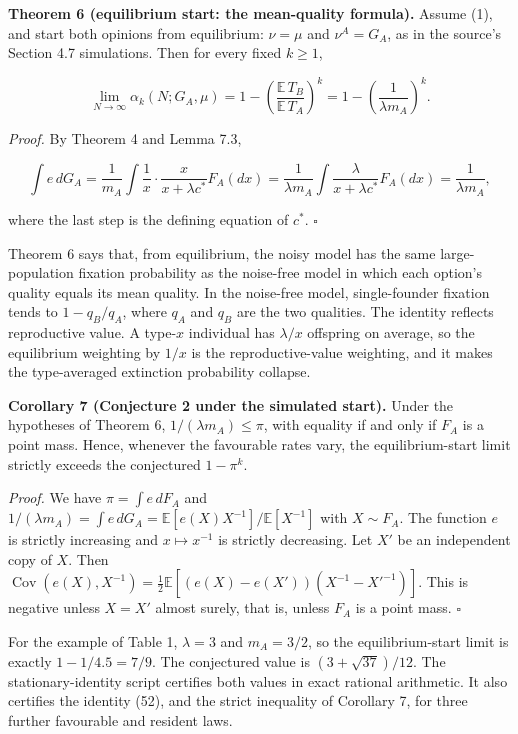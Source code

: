 \documentclass[
  british,
  11pt,
  a4paper,
]{article}
\begin{document}
\textbf{Theorem 6 (equilibrium start: the mean-quality formula).} Assume
(1), and start both opinions from equilibrium: \(\nu=\mu\) and
\(\nu^A=G_A\), as in the source's Section 4.7 simulations. Then for
every fixed \(k\ge1\),

\[
\lim_{N\to\infty}\alpha_k(N;G_A,\mu)=1-\left(\frac{\mathbb E\,T_B}{\mathbb E\,T_A}\right)^k
=1-\left(\frac1{\lambda m_A}\right)^k.
\tag{52}
\]

\emph{Proof.} By Theorem 4 and Lemma 7.3,

\[
\int e\,dG_A=\frac1{m_A}\int\frac1x\cdot\frac x{x+\lambda c^\ast}F_A(dx)
=\frac1{\lambda m_A}\int\frac\lambda{x+\lambda c^\ast}F_A(dx)=\frac1{\lambda m_A},
\]

where the last step is the defining equation of \(c^\ast\). \(\square\)

Theorem 6 says that, from equilibrium, the noisy model has the same
large-population fixation probability as the noise-free model in which
each option's quality equals its mean quality. In the noise-free model,
single-founder fixation tends to \(1-q_B/q_A\), where \(q_A\) and
\(q_B\) are the two qualities. The identity reflects reproductive value.
A type-\(x\) individual has \(\lambda/x\) offspring on average, so the
equilibrium weighting by \(1/x\) is the reproductive-value weighting,
and it makes the type-averaged extinction probability collapse.

\textbf{Corollary 7 (Conjecture 2 under the simulated start).} Under the
hypotheses of Theorem 6, \(1/(\lambda m_A)\le\pi\), with equality if and
only if \(F_A\) is a point mass. Hence, whenever the favourable rates
vary, the equilibrium-start limit strictly exceeds the conjectured
\(1-\pi^k\).

\emph{Proof.} We have \(\pi=\int e\,dF_A\) and
\(1/(\lambda m_A)=\int e\,dG_A=\mathbb E[e(X)X^{-1}]/\mathbb E[X^{-1}]\)
with \(X\sim F_A\). The function \(e\) is strictly increasing and
\(x\mapsto x^{-1}\) is strictly decreasing. Let \(X'\) be an independent
copy of \(X\). Then
\(\operatorname{Cov}(e(X),X^{-1})=\frac12\mathbb E[(e(X)-e(X'))(X^{-1}-X'^{-1})]\).
This is negative unless \(X=X'\) almost surely, that is, unless \(F_A\)
is a point mass. \(\square\)

For the example of Table 1, \(\lambda=3\) and \(m_A=3/2\), so the
equilibrium-start limit is exactly \(1-1/4.5=7/9\). The conjectured
value is \((3+\sqrt{37})/12\). The stationary-identity script certifies
both values in exact rational arithmetic. It also certifies the identity
(52), and the strict inequality of Corollary 7, for three further
favourable and resident laws.
\end{document}
